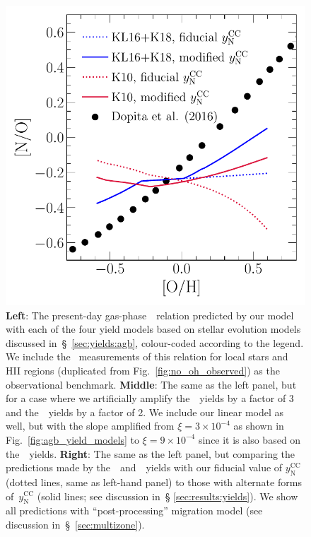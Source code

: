 \documentclass[ms.tex]{subfiles}
\begin{document}
\begin{figure}
\includegraphics[scale = 0.45]{no_oh_predictions_karakas.pdf}
\caption{
\textbf{Left}: The present-day gas-phase~\ohno~relation predicted by our
model with each of the four yield models based on stellar evolution models
discussed in~\S~\ref{sec:yields:agb}, colour-coded according to the legend.
We include the~\citet{Dopita2016} measurements of this relation for local stars
and HII regions (duplicated from Fig.~\ref{fig:no_oh_observed}) as the
observational benchmark.
\textbf{Middle}: The same as the left panel, but for a case where we
artificially amplify the~\cristallo~yields by a factor of 3 and
the~\ventura~yields by a factor of 2.
We include our linear model as well, but with the slope amplified from
$\xi = 3\times10^{-4}$ as shown in Fig.~\ref{fig:agb_yield_models} to
$\xi = 9\times10^{-4}$ since it is also based on the~\cristallo~yields.
\textbf{Right}: The same as the left panel, but comparing the predictions made
by the~\karakasten~and~\karakas~yields with our fiducial value of
$y_\text{N}^\text{CC}$ (dotted lines, same as left-hand panel) to those with
alternate forms of~$y_\text{N}^\text{CC}$ (solid lines; see discussion in~\S
\ref{sec:results:yields}).
We show all predictions with ``post-processing'' migration model (see
discussion in~\S~\ref{sec:multizone}).
}
\label{fig:no_oh_predictions}
\end{figure}
\end{document}
